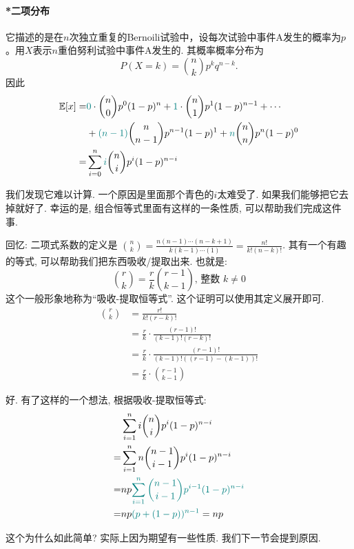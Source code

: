     \begin{shaded}
        \paragraph{*二项分布} 它描述的是在$n$次独立重复的Bernoili试验中，设每次试验中事件A发生的概率为$p$。用$X$表示$n$重伯努利试验中事件A发生的{}.
        其概率概率分布为$$P(X=k)={n\choose k} p^k q^{n-k}.$$
        因此
    $$
\begin{aligned}
\mathbb E[x]= & {{\color{teal}0}} \cdot {n \choose 0} p^0(1-p)^n+{{\color{teal}1}} \cdot\binom n1 p^1(1-p)^{n-1}+\cdots \\
& +{{\color{teal}(n-1)}}\binom n{n-1} p^{n-1}(1-p)^1  +{{\color{teal}n}}\binom nn
 p^n(1-p)^0 \\
= & \sum_{i=0}^n {{\color{teal}i}}\binom ni p^i(1-p)^{n-i}
\end{aligned}
$$

我们发现它难以计算. 一个原因是里面那个青色的$i$太难受了. 如果我们能够把它去掉就好了. 幸运的是, 组合恒等式里面有这样的一条性质, 可以帮助我们完成这件事. 

回忆: 二项式系数的定义是 $\binom nk = \frac{n(n-1) \cdots(n-k+1)}{k(k-1) \cdots(1)}=\frac{n !}{k !(n-k) !}$. 其有一个有趣的等式, 可以帮助我们把东西吸收/提取出来. 也就是: 
$$
\binom rk=\frac{r}{k}\binom{r-1}{k-1} \text {, 整数 } k \neq 0
$$
这个一般形象地称为``吸收-提取恒等式''. 这个证明可以使用其定义展开即可. 
$$
\begin{aligned}
\binom rk & =\frac{r !}{k !(r-k) !} \\
& =\frac{r}{k} \cdot \frac{(r-1) !}{(k-1) !(r-k) !} \\
& =\frac{r}{k} \cdot \frac{(r-1) !}{(k-1) !((r-1)-(k-1)) !} \\
& =\frac{r}{k} \cdot \binom {r-1}{k-1}
\end{aligned}
$$


好. 有了这样的一个想法,  根据吸收-提取恒等式:
$$
\begin{aligned}
& \sum_{i=1}^n i\binom ni p^i(1-p)^{n-i} \\
= & \sum_{i=1}^n n\binom{n-1}{i-1} p^i(1-p)^{n-i} \\
= & n p {{\color{teal}\sum_{i=1}^n\binom{n-1}{i-1} p^{i-1}(1-p)^{n-i}}} \\
= & n p{{\color{teal}(p+(1-p))^{n-1}}}=n p
\end{aligned}
$$

这个为什么如此简单? 实际上因为期望有一些性质. 我们下一节会提到原因. 
    \end{shaded}

